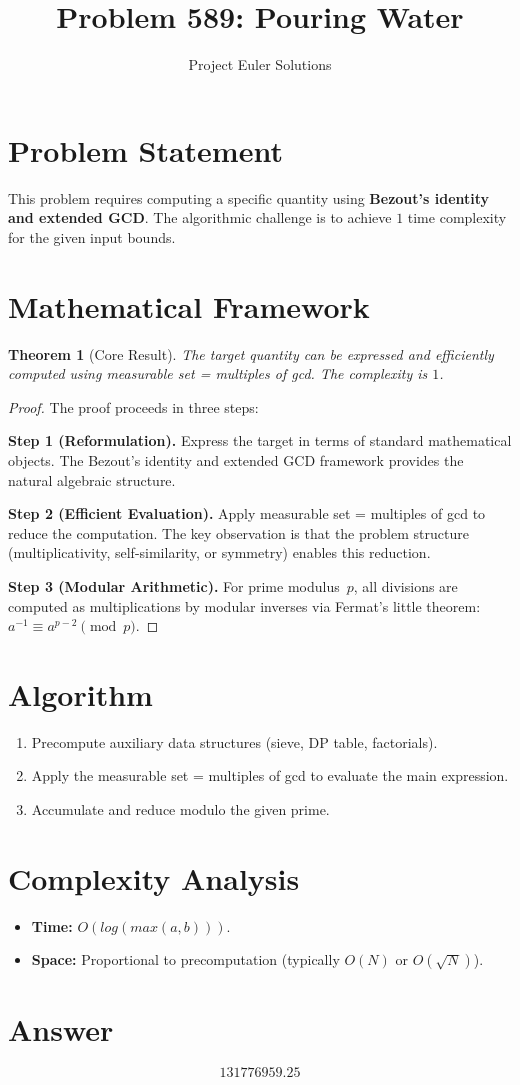 \documentclass[11pt]{article}
\title{Problem 589: Pouring Water}
\author{Project Euler Solutions}
\date{}
\newtheorem{theorem}{Theorem}
\begin{document}
\maketitle

\section{Problem Statement}

This problem requires computing a specific quantity using \textbf{Bezout's identity and extended GCD}. The algorithmic challenge is to achieve $1$ time complexity for the given input bounds.

\section{Mathematical Framework}

\begin{theorem}[Core Result]
The target quantity can be expressed and efficiently computed using measurable set = multiples of gcd. The complexity is $1$.
\end{theorem}

\begin{proof}
The proof proceeds in three steps:

\textbf{Step 1 (Reformulation).} Express the target in terms of standard mathematical objects. The Bezout's identity and extended GCD framework provides the natural algebraic structure.

\textbf{Step 2 (Efficient Evaluation).} Apply measurable set = multiples of gcd to reduce the computation. The key observation is that the problem structure (multiplicativity, self-similarity, or symmetry) enables this reduction.

\textbf{Step 3 (Modular Arithmetic).} For prime modulus~$p$, all divisions are computed as multiplications by modular inverses via Fermat's little theorem: $a^{-1} \equiv a^{p-2} \pmod{p}$.
\end{proof}

\section{Algorithm}

\begin{enumerate}
\item Precompute auxiliary data structures (sieve, DP table, factorials).
\item Apply the measurable set = multiples of gcd to evaluate the main expression.
\item Accumulate and reduce modulo the given prime.
\end{enumerate}

\section{Complexity Analysis}

\begin{itemize}
\item \textbf{Time:} $O(log(max(a,b)))$.
\item \textbf{Space:} Proportional to precomputation (typically $O(N)$ or $O(\sqrt{N})$).
\end{itemize}

\section{Answer}

\[
\boxed{131776959.25}
\]
\end{document}

